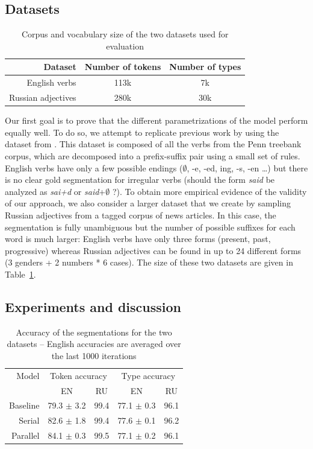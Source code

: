 \subsection{Datasets}
\begin{table}[h]
    \center
    \begin{tabular}{r c c}
        \toprule
        Dataset & Number of tokens & Number of types \\
        \midrule
  English verbs & 113k & 7k \\
        Russian adjectives & 280k & 30k \\
        \bottomrule
    \end{tabular}
    \caption{Corpus and vocabulary size of the two datasets used for evaluation}
    \label{tab:datasets}
\end{table}

Our first goal is to prove that the different parametrizations of the model perform equally well. To do so, we attempt to replicate previous work by using the dataset from \cite{goldwater2011}. This dataset is composed of all the verbs from the Penn treebank corpus, which are decomposed into a prefix-suffix pair using a small set of rules. English verbs have only a few possible endings ($\emptyset$, -e, -ed, ing, -s, -en \dots) but there is no clear gold segmentation for irregular verbs (should the form \textit{said} be analyzed as \textit{sai+d} or \textit{said}+$\emptyset$ ?). To obtain more empirical evidence of the validity of our approach, we also consider a larger dataset that we create by sampling Russian adjectives from a tagged corpus of news articles. In this case, the segmentation is fully unambiguous but the number of possible suffixes for each word is much larger: English verbs have only three forms (present, past, progressive) whereas Russian adjectives can be found in up to 24 different forms (3 genders + 2 numbers * 6 cases). The size of these two datasets are given in Table~\ref{tab:datasets}.

\subsection{Experiments and discussion}

\begin{table}[h]
    \center
    \begin{tabular}{r c c c c}
        \toprule
        Model & \multicolumn{2}{c}{Token accuracy} & \multicolumn{2}{c}{Type accuracy} \\
        \cmidrule(r){2-3} \cmidrule(r){4-5}
        & EN & RU & EN & RU \\
        \midrule
        Baseline & 79.3 $\pm$ 3.2 & 99.4 & 77.1 $\pm$ 0.3 & 96.1 \\
          Serial & 82.6 $\pm$ 1.8 & 99.4 & 77.6 $\pm$ 0.1 & 96.2 \\
        Parallel & 84.1 $\pm$ 0.3 & 99.5 & 77.1 $\pm$ 0.2 & 96.1 \\
        \bottomrule
    \end{tabular}
    \caption{Accuracy of the segmentations for the two datasets -- English accuracies are averaged over the last 1000 iterations}
    \label{tab:accuracy}
\end{table}

